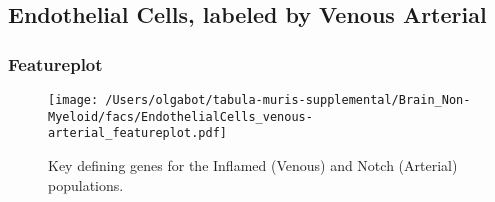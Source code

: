 \clearpage
\subsection{Endothelial Cells, labeled by Venous Arterial}

\clearpage
\subsubsection{Featureplot}
\begin{figure}[h]
\centering
\texttt{[image: /Users/olgabot/tabula-muris-supplemental/Brain\_Non-Myeloid/facs/EndothelialCells\_venous-arterial\_featureplot.pdf]}

\caption{Key defining genes for the Inflamed (Venous) and Notch (Arterial) populations.
}
\end{figure}

